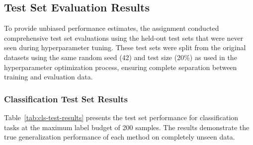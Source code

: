 \documentclass[conference]{IEEEtran}
\begin{document}
\subsection{Test Set Evaluation Results}

To provide unbiased performance estimates, the assignment conducted comprehensive test set evaluations using the held-out test sets that were never seen during hyperparameter tuning. These test sets were split from the original datasets using the same random seed (42) and test size (20\%) as used in the hyperparameter optimization process, ensuring complete separation between training and evaluation data.

\subsubsection{Classification Test Set Results}

Table~\ref{tab:cls-test-results} presents the test set performance for classification tasks at the maximum label budget of 200 samples. The results demonstrate the true generalization performance of each method on completely unseen data.
\end{document}
